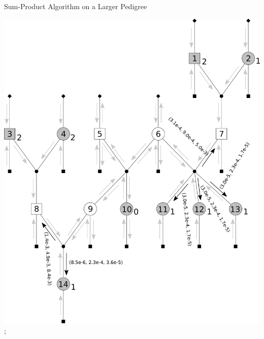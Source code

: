 \documentclass[letter,graphicx]{beamer}
\begin{document}
\begin{frame}{Sum-Product Algorithm on a Larger Pedigree} 
\begin{center} 
\includegraphics[height = 0.8\textheight]{./images/mg-example-step9.pdf}; 
\end{center}
\end{frame}
\end{document}
